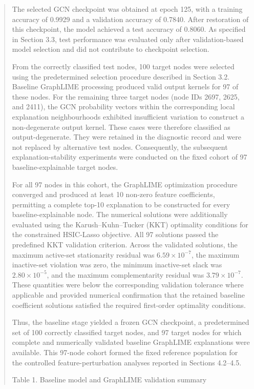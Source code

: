 \documentclass[a4paper]{article}
\begin{document}
\begin{quote}
The selected GCN checkpoint was obtained at epoch 125, with a training
accuracy of 0.9929 and a validation accuracy of 0.7840. After
restoration of this checkpoint, the model achieved a test accuracy of
0.8060. As specified in Section 3.3, test performance was evaluated only
after validation-based model selection and did not contribute to
checkpoint selection.

From the correctly classified test nodes, 100 target nodes were selected
using the predetermined selection procedure described in Section 3.2.
Baseline GraphLIME processing produced valid output kernels for 97 of
these nodes. For the remaining three target nodes (node IDs 2697, 2625,
and 2411), the GCN probability vectors within the corresponding local
explanation neighbourhoods exhibited insufficient variation to construct
a non-degenerate output kernel. These cases were therefore classified as
output-degenerate. They were retained in the diagnostic record and were
not replaced by alternative test nodes. Consequently, the subsequent
explanation-stability experiments were conducted on the fixed cohort of
97 baseline-explainable target nodes.

For all 97 nodes in this cohort, the GraphLIME optimization procedure
converged and produced at least 10 non-zero feature coefficients,
permitting a complete top-10 explanation to be constructed for every
baseline-explainable node. The numerical solutions were additionally
evaluated using the Karush--Kuhn--Tucker (KKT) optimality conditions for
the constrained HSIC-Lasso objective. All 97 solutions passed the
predefined KKT validation criterion. Across the validated solutions, the
maximum active-set stationarity residual was \(6.59 \times 10^{- 7}\),
the maximum inactive-set violation was zero, the minimum inactive-set
slack was \(2.80 \times 10^{- 5}\), and the maximum complementarity
residual was \(3.79 \times 10^{- 7}\). These quantities were below the
corresponding validation tolerance where applicable and provided
numerical confirmation that the retained baseline coefficient solutions
satisfied the required first-order optimality conditions.

Thus, the baseline stage yielded a frozen GCN checkpoint, a
predetermined set of 100 correctly classified target nodes, and 97
target nodes for which complete and numerically validated baseline
GraphLIME explanations were available. This 97-node cohort formed the
fixed reference population for the controlled feature-perturbation
analyses reported in Sections 4.2--4.5.

Table 1. Baseline model and GraphLIME validation summary
\end{quote}
\end{document}
